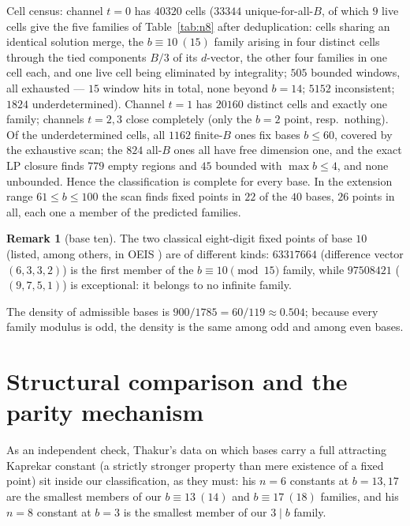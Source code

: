 \documentclass[11pt]{amsart}
\theoremstyle{definition}
\newtheorem{remark}[theorem]{Remark}
\begin{document}
Cell census: channel $t=0$ has $40320$ cells ($33344$ unique-for-all-$B$,
of which $9$ live cells give the five families of Table~\ref{tab:n8}
after deduplication: cells sharing an identical solution merge, the
$b\equiv 10\ (15)$ family arising in four distinct cells through the
tied components $B/3$ of its $d$-vector, the other four families in one
cell each, and one live cell being eliminated by integrality; $505$
bounded windows, all exhausted --- $15$ window hits in total, none
beyond $b=14$; $5152$
inconsistent; $1824$ underdetermined). Channel $t=1$ has $20160$
distinct cells and exactly one family; channels $t=2,3$ close completely
(only the $b=2$ point, resp.\ nothing). Of the underdetermined cells,
all $1162$ finite-$B$ ones fix bases $b\le 60$, covered by the
exhaustive scan; the $824$ all-$B$ ones all have free dimension one, and
the exact LP closure finds $779$ empty regions and $45$ bounded with
$\max b\le 4$, and none unbounded. Hence the classification is complete
for every base. In the extension range $61\le b\le 100$ the scan finds
fixed points in $22$ of the $40$ bases, $26$ points in all, each one a
member of the predicted families.

\begin{remark}[base ten]
The two classical eight-digit fixed points of base $10$ (listed, among
others, in OEIS \cite{OEIS}) are of different kinds: $63317664$
(difference vector $(6,3,3,2)$) is the first member of the
$b\equiv 10\pmod{15}$ family, while $97508421$ ($(9,7,5,1)$) is
exceptional: it belongs to no infinite family.
\end{remark}

The density of admissible bases is $900/1785=60/119\approx 0.504$;
because every family modulus is odd, the density is the same among odd
and among even bases.

\section{Structural comparison and the parity mechanism}\label{sec:compare}

As an independent check, Thakur's data \cite{Thakur19} on which bases
carry a full attracting Kaprekar constant (a strictly stronger property
than mere existence of a fixed point) sit inside our classification, as
they must: his $n=6$ constants at $b=13,17$ are the smallest members of
our $b\equiv13\ (14)$ and $b\equiv17\ (18)$ families, and his $n=8$
constant at $b=3$ is the smallest member of our $3\mid b$ family.
\end{document}
